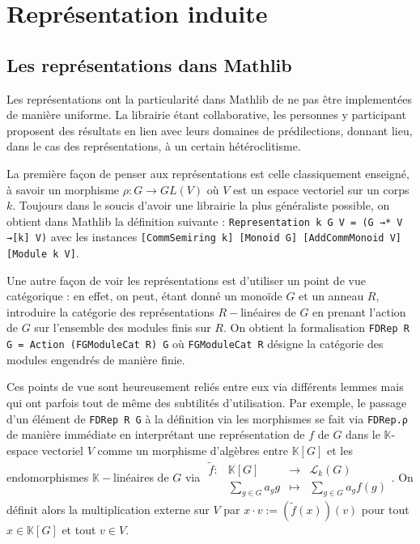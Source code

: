 \documentclass[10pt]{article}
\newcommand{\fonction}[5]{\begin{array}{l|rcl}
		#1: & #2 & \longrightarrow & #3 \\
		& #4 & \longmapsto & #5 \end{array}}
\theoremstyle{definition}
\begin{document}
\section{Représentation induite}

\subsection{Les représentations dans Mathlib}
Les représentations ont la particularité dans Mathlib de ne pas être implementées de manière uniforme. La librairie étant collaborative, les personnes y participant proposent des résultats en lien avec leurs domaines de prédilections, donnant lieu, dans le cas des représentations, à un certain hétéroclitisme.
\newline

La première façon de penser aux représentations est celle classiquement enseigné, à savoir un morphisme $\rho : G \rightarrow GL(V)$ où $V$ est un espace vectoriel sur un corps $k$. Toujours dans le soucis d'avoir une librairie la plus généraliste possible, on obtient dans Mathlib la définition suivante : \lstinline|Representation k G V = (G →* V →[k] V)| avec les instances \lstinline|[CommSemiring k] [Monoid G] [AddCommMonoid V] [Module k V]|.
\newline

Une autre façon de voir les représentations est d'utiliser un point de vue catégorique : en effet, on peut, étant donné un monoïde $G$ et un anneau $R$, introduire la catégorie des représentations $R-$linéaires de $G$ en prenant l'action de $G$ sur l'ensemble des modules finis sur $R$. On obtient la formalisation \lstinline|FDRep R G = Action (FGModuleCat R) G| où \lstinline|FGModuleCat R| désigne la catégorie des modules engendrés de manière finie.
\newline

Ces points de vue sont heureusement reliés entre eux via différents lemmes mais qui ont parfois tout de même des subtilités d'utilisation. Par exemple, le passage d'un élément de \lstinline|FDRep R G| à la définition via les morphismes se fait via \lstinline|FDRep.ρ| de manière immédiate en interprétant une représentation de $f$ de $G$ dans le $\mathbb{K}$-espace vectoriel $V$	comme un morphisme d'algèbres entre $\mathbb{K}[G]$ et les endomorphismes $\mathbb{K}-$linéaires de $G$ via $\fonction{\tilde{f}}{\mathbb{K}[G]}{\mathcal{L}_k(G)}{\sum\limits_{g\in G}a_gg}{\sum\limits_{g\in G}a_g f(g)}$. On définit alors la multiplication externe sur $V$ par $x\cdot v := (\tilde{f}(x))(v)$ pour tout $x\in \mathbb{K}[G]$ et tout $v\in V$.
\end{document}

